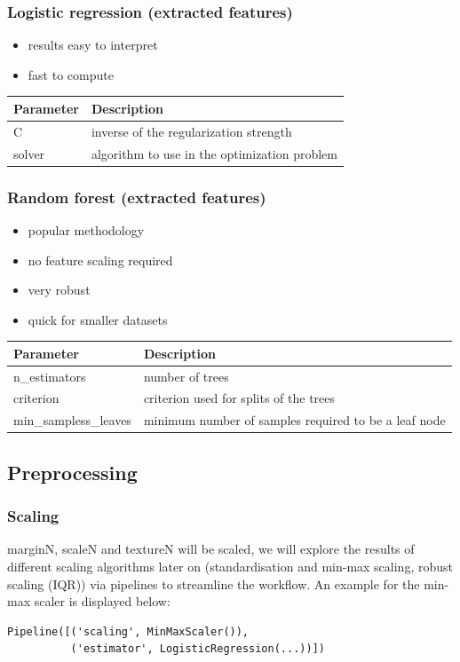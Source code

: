 \documentclass{sig-alternate-05-2015}
\begin{document}
\subsubsection{Logistic regression (extracted features)}

\begin{itemize}
  \item results easy to interpret
  \item fast to compute
\end{itemize}

\begin{tabular}{|l|l|}
\hline
Parameter & Description \\
\hline
C & inverse of the regularization strength \\
\hline
solver & algorithm to use in the optimization problem \\
\hline
\end{tabular}

\subsubsection{Random forest (extracted features)}
\begin{itemize}
  \item popular methodology
  \item no feature scaling required
  \item very robust
  \item quick for smaller datasets
\end{itemize}

\begin{tabular}{|l|p{50mm}|}
\hline
Parameter & Description \\
\hline
n\_estimators & number of trees \\
\hline
criterion & criterion used for splits of the trees \\
\hline
min\_sampless\_leaves & minimum number of samples required to be a leaf node \\
\hline
\end{tabular}

\subsection{Preprocessing}

\subsubsection{Scaling}
marginN, scaleN and textureN will be scaled, we will explore the results of different scaling algorithms later on (standardisation and min-max scaling, robust scaling (IQR)) via pipelines to streamline the workflow.
An example for the min-max scaler is displayed below:
\begin{verbatim}
Pipeline([('scaling', MinMaxScaler()),
          ('estimator', LogisticRegression(...))])
\end{verbatim}
\end{document}
